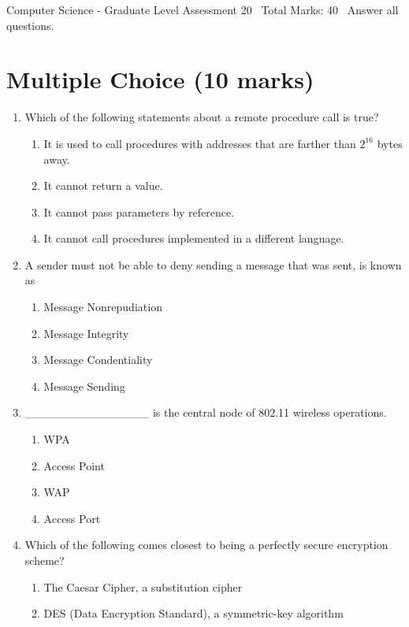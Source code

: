 \documentclass[12pt]{article}
\begin{document}
\begin{center}
Computer Science - Graduate Level Assessment 20 \
Total Marks: 40 \
Answer all questions.
\end{center}

\section*{Multiple Choice (10 marks)}
\begin{enumerate}[label=\arabic*.]
\item Which of the following statements about a remote procedure call is true?
\begin{enumerate}[label=(\alph*)]
    \item It is used to call procedures with addresses that are farther than $2^16$ bytes away.
    \item It cannot return a value.
    \item It cannot pass parameters by reference.
    \item It cannot call procedures implemented in a different language.
\end{enumerate}
\item A sender must not be able to deny sending a message that was sent, is known as
\begin{enumerate}[label=(\alph*)]
    \item Message Nonrepudiation
    \item Message Integrity
    \item Message Condentiality
    \item Message Sending
\end{enumerate}
\item \_\_\_\_\_\_\_\_\_\_\_\_\_\_\_ is the central node of 802.11 wireless operations.
\begin{enumerate}[label=(\alph*)]
    \item WPA
    \item Access Point
    \item WAP
    \item Access Port
\end{enumerate}
\item Which of the following comes closest to being a perfectly secure encryption scheme?
\begin{enumerate}[label=(\alph*)]
    \item The Caesar Cipher, a substitution cipher
    \item DES (Data Encryption Standard), a symmetric-key algorithm

\end{enumerate}
\end{enumerate}
\end{document}
